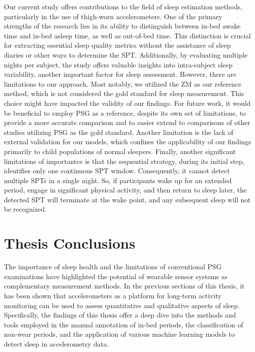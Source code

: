 \documentclass[
  10pt,
]{scrbook}
\begin{document}
Our current study offers contributions to the field of sleep estimation
methods, particularly in the use of thigh-worn accelerometers. One of
the primary strengths of the research lies in its ability to distinguish
between in-bed awake time and in-bed asleep time, as well as out-of-bed
time. This distinction is crucial for extracting essential sleep quality
metrics without the assistance of sleep diaries or other ways to
determine the SPT. Additionally, by evaluating multiple nights per
subject, the study offers valuable insights into intra-subject sleep
variability, another important factor for sleep assessment. However,
there are limitations to our approach. Most notably, we utilized the ZM
as our reference method, which is not considered the gold standard for
sleep measurement. This choice might have impacted the validity of our
findings. For future work, it would be beneficial to employ PSG as a
reference, despite its own set of limitations, to provide a more
accurate comparison and to easier extend to comparisons of other studies
utilizing PSG as the gold standard. Another limitation is the lack of
external validation for our models, which confines the applicability of
our findings primarily to child populations of normal sleepers. Finally,
another significant limitations of importantce is that the sequential
strategy, during its initial step, identifies only one continuous SPT
window. Consequently, it cannot detect multiple SPTs in a single night.
So, if participants wake up for an extended period, engage in
significant physical activity, and then return to sleep later, the
detected SPT will terminate at the wake point, and any subsequent sleep
will not be recognized.

\hypertarget{thesis-conclusions}{%
\chapter{Thesis Conclusions}\label{thesis-conclusions}}

The importance of sleep health and the limitations of conventional PSG
examinations have highlighted the potential of wearable sensor systems
as complementary measurement methods. In the previous sections of this
thesis, it has been shown that accelerometers as a platform for
long-term activity monitoring can be used to assess quantitative and
qualitative aspects of sleep. Specifically, the findings of this thesis
offer a deep dive into the methods and tools employed in the manual
annotation of in-bed periods, the classification of non-wear periods,
and the application of various machine learning models to detect sleep
in accelerometry data.
\end{document}
